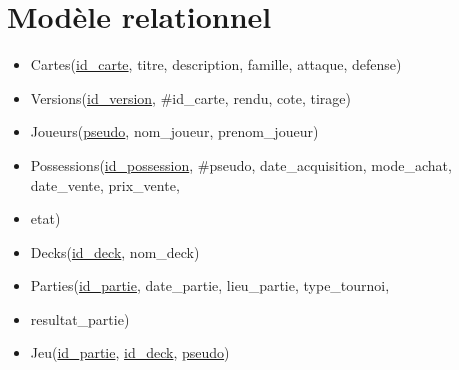 \documentclass{article}
\begin{document}
\section{Modèle relationnel}

\begin{itemize}


    \item[] Cartes(\underline{id\_carte}, titre, description, famille, attaque, defense) \\
    \item[] Versions(\underline{id\_version}, \#id\_carte, rendu, cote, tirage) \\
    \item[] Joueurs(\underline{pseudo}, nom\_joueur, prenom\_joueur) \\
    \item[] Possessions(\underline{id\_possession}, \#pseudo, date\_acquisition, mode\_achat, date\_vente, prix\_vente,
    \item[] etat) \\
    \item[] Decks(\underline{id\_deck}, nom\_deck) \\
    \item[] Parties(\underline{id\_partie}, date\_partie, lieu\_partie, type\_tournoi,
    \item[] resultat\_partie) \\
    \item[] Jeu(\underline{id\_partie}, \underline{id\_deck}, \underline{pseudo}) \\

\end{itemize}
\end{document}
